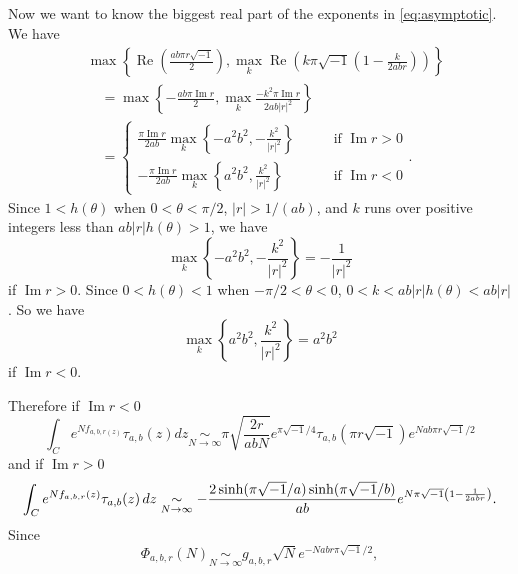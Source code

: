 \documentclass[a4paper,draft]{amsart}
\theoremstyle{plain}
\theoremstyle{definition}
\theoremstyle{remark}
\renewcommand{\Re}{\operatorname{Re}}
\renewcommand{\Im}{\operatorname{Im}}
\numberwithin{equation}{section}
\begin{document}
\par
Now we want to know the biggest real part of the exponents in
\eqref{eq:asymptotic}.
We have
\begin{equation*}
\begin{split}
  &
  \max
  \left\{
    \Re\left(\frac{ab\pi{r}\sqrt{-1}}{2}\right),
    \max_{k}{\Re\left(k\pi\sqrt{-1}\left(1-\frac{k}{2abr}\right)\right)}
  \right\}
  \\
  &\quad=
  \max
  \left\{
    -\frac{ab\pi\Im{r}}{2},
    \max_{k}{\frac{-k^2\pi\Im{r}}{2ab|r|^2}}
  \right\}
  \\
  &\quad=
  \begin{cases}
    \displaystyle
    \frac{\pi\Im{r}}{2ab}\max_{k}
    \left\{
      -a^2b^2,-\frac{k^2}{|r|^2}
    \right\}
    &\qquad\text{if $\Im{r}>0$}
    \\[5mm]
    \displaystyle
    -\frac{\pi\Im{r}}{2ab}\max_{k}
    \left\{
      a^2b^2,\frac{k^2}{|r|^2}
    \right\}
    &\qquad\text{if $\Im{r}<0$}
  \end{cases}.
\end{split}
\end{equation*}
Since $1<h(\theta)$ when $0<\theta<\pi/2$, $|r|>1/(ab)$, and $k$
runs over positive integers less than $ab|r|h(\theta)>1$, we have
\begin{equation*}
  \max_{k}\left\{-a^2b^2,-\frac{k^2}{|r|^2}\right\}
  =
  -\frac{1}{|r|^2}
\end{equation*}
if $\Im{r}>0$.
Since $0<h(\theta)<1$ when $-\pi/2<\theta<0$, $0<k<ab|r|h(\theta)<ab|r|$.
So we have
\begin{equation*}
  \max_{k}\left\{a^2b^2,\frac{k^2}{|r|^2}\right\}
  =
  a^2b^2
\end{equation*}
if $\Im{r}<0$.
\par
Therefore if $\Im{r}<0$
\begin{equation*}
  \int_{C}
  e^{Nf_{a,b,r(z)}}\tau_{a,b}(z)dz
  \underset{N\to\infty}{\sim}
  \pi\sqrt{\frac{2r}{abN}}e^{\pi\sqrt{-1}/4}
  \tau_{a,b}(\pi{r}\sqrt{-1})
  e^{Nab\pi{r}\sqrt{-1}/2}
\end{equation*}
and if $\Im{r}>0$
\begin{equation*}
  \int_{C}
  e^{Nf_{a,b,r}(z)}\tau_{a,b}(z)\,dz
  \\
  \underset{N\to\infty}{\sim}
  -
  \frac{2\sinh(\pi\sqrt{-1}/a)\sinh(\pi\sqrt{-1}/b)}{ab}
  e^{N\pi\sqrt{-1}\left(1-\frac{1}{2abr}\right)}.
\end{equation*}
Since
\begin{equation*}
  \Phi_{a,b,r}(N)
  \underset{N\to\infty}{\sim}
  g_{a,b,r}\sqrt{N}e^{-Nabr\pi\sqrt{-1}/2},
\end{equation*}
\end{document}
